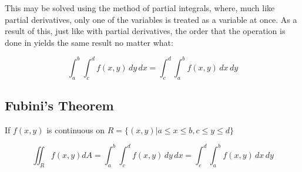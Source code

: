 \documentclass[12pt]{article}
\begin{document}
This may be solved using the method of partial integrals, where, much like partial derivatives, only one of the variables is treated as a variable at once. As a result of this, just like with partial derivatives, the order that the operation is done in yields the same result no matter what:

$$\int_a^b \int_c^d f(x,y)\,dy\,dx=\int_c^d\int_a^b f(x,y)\,dx\,dy$$

\subsection{Fubini's Theorem}

If $f(x,y)$ is continuous on $R=\{(x,y)|a\leq x\leq b, c\leq y\leq d\}$

$$\iint_R f(x,y) dA=\int_a^b \int_c^d f(x,y)\,dy\,dx=\int_c^d\int_a^b f(x,y)\,dx\,dy$$
\end{document}
